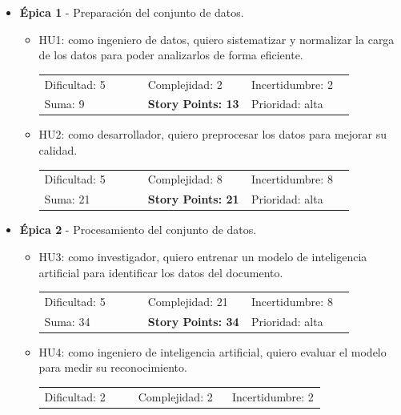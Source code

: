 \documentclass[
11pt, %
]{charter}
\begin{document}
\begin{itemize}
  \item \textbf{\'{E}pica 1} - Preparación del conjunto de datos.
    \begin{itemize}
      \item HU1: como ingeniero de datos, quiero sistematizar y normalizar la carga de los datos para poder analizarlos de forma eficiente. \\
      \begin{tabular}{p{0.33\linewidth} p{0.33\linewidth} p{0.33\linewidth}}
      Dificultad: 5	& Complejidad: 2 & Incertidumbre: 2 \\
      Suma: 9		& \textbf{Story Points: 13} & Prioridad: alta \\
      \end{tabular}
      \item HU2: como desarrollador, quiero preprocesar los datos para mejorar su calidad. \\
      \begin{tabular}{p{0.33\linewidth} p{0.33\linewidth} p{0.33\linewidth}}
      Dificultad: 5	& Complejidad: 8 & Incertidumbre: 8 \\
      Suma: 21		& \textbf{Story Points: 21} & Prioridad: alta \\
      \end{tabular}
    \end{itemize}
  \item \textbf{\'{E}pica 2} - Procesamiento del conjunto de datos.
    \begin{itemize}
      \item HU3: como investigador, quiero entrenar un modelo de inteligencia artificial para identificar los datos del documento. \\
      \begin{tabular}{p{0.33\linewidth} p{0.33\linewidth} p{0.33\linewidth}}
      Dificultad: 5	& Complejidad: 21 & Incertidumbre: 8 \\
      Suma: 34		& \textbf{Story Points: 34} & Prioridad: alta \\
      \end{tabular}
      \item HU4: como ingeniero de inteligencia artificial, quiero evaluar el modelo para medir su reconocimiento. \\
      \begin{tabular}{p{0.33\linewidth} p{0.33\linewidth} p{0.33\linewidth}}
      Dificultad: 2	& Complejidad: 2 & Incertidumbre: 2 \\

\end{tabular}
\end{itemize}
\end{itemize}
\end{document}
